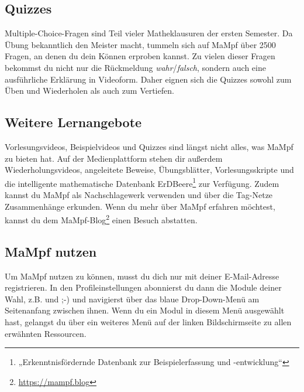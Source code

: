 \subsection{Quizzes}
Multiple-Choice-Fragen sind Teil vieler Matheklausuren der ersten Semester. Da Übung bekanntlich den Meister macht, tummeln sich auf MaMpf über 2500 Fragen, an denen du dein Können erproben kannst. Zu vielen dieser Fragen bekommst du nicht nur die Rückmeldung \emph{wahr}/\emph{falsch}, sondern auch eine ausführliche Erklärung in Videoform. Daher eignen sich die Quizzes sowohl zum Üben und Wiederholen als auch zum Vertiefen.

\subsection{Weitere Lernangebote}
Vorlesungsvideos, Beispielvideos und Quizzes sind längst nicht alles, was MaMpf zu bieten hat.
Auf der Medienplattform stehen dir außerdem Wiederholungsvideos, angeleitete Beweise, Übungsblätter, Vorlesungsskripte und die intelligente mathematische Datenbank ErDBeere\footnote{„Erkenntnisfördernde Datenbank zur Beispielerfassung und -entwicklung“} zur Verfügung. Zudem kannst du MaMpf als Nachschlagewerk verwenden und über die Tag-Netze Zusammenhänge erkunden. Wenn du mehr über MaMpf erfahren möchtest, kannst du dem MaMpf-Blog\footnote{\url{https://mampf.blog}} einen Besuch abstatten.  

\subsection{MaMpf nutzen}
Um MaMpf nutzen zu können, musst du dich nur mit deiner E-Mail-Adresse registrieren. In den Profileinstellungen abonnierst du dann die Module deiner Wahl, z.B.  und  ;-) und navigierst über das blaue Drop-Down-Menü am Seitenanfang zwischen ihnen. Wenn du ein Modul in diesem Menü ausgewählt hast, gelangst du über ein weiteres Menü auf der linken Bildschirmseite zu allen erwähnten Ressourcen.
